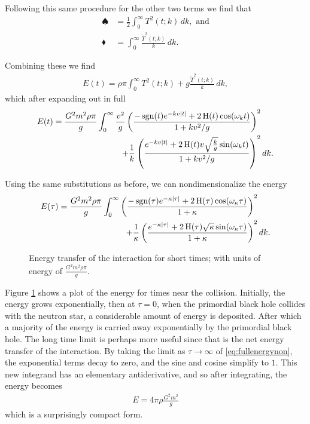 Following this same procedure for the other two terms we find that
\begin{align*}
\spadesuit &= \frac{1}{2} \int_0^\infty T^2(t;k) \, dk, \text{ and} \\
\blacklozenge &= \int_0^\infty \frac{\widetilde{T}^2(t;k)}{k} \, dk.
\end{align*}

Combining these we find
\begin{align*}
E(t) = \rho \pi \int_0^\infty T^2(t;k) + g \frac{\widetilde{T}^2(t;k)}{k} \, dk,
\end{align*}
which after expanding out in full
\begin{equation*}
\begin{split}
E(t) = \frac{G^2 m^2 \rho \pi}{g} \int_0^\infty \frac{v^2}{g} \left( \frac{- \operatorname{sgn}(t) e^{-kv |t|} + 2 \operatorname{H}(t) \cos(\omega_k t)}{1+kv^2/g} \right)^2& \\
+ \frac{1}{k} \left( \frac{e^{-kv |t|} + 2 \operatorname{H}(t) v \sqrt{\frac{k}{g}} \sin(\omega_k t)}{1+kv^2/g} \right)^2& \, dk.
\end{split}
\end{equation*}

Using the same substitutions as before, we can nondimensionalize the energy
\begin{equation}
\label{eq:fullenergynon}
\begin{split}
E(\tau) = \frac{G^2 m^2 \rho \pi}{g} \int_0^\infty \left( \frac{- \operatorname{sgn}(\tau) e^{-\kappa |\tau|} + 2 \operatorname{H}(\tau) \cos(\omega_\kappa \tau)}{1+\kappa} \right)^2& \\
+ \frac{1}{\kappa} \left( \frac{e^{-\kappa |\tau|} + 2 \operatorname{H}(\tau) \sqrt{\kappa} \sin(\omega_\kappa \tau)}{1+\kappa} \right)^2& \, dk.
\end{split}
\end{equation}

\begin{figure}[p]
 
 \caption[Analytic Energy Transfer]{Energy transfer of the interaction for short times; with units of energy of $\frac{G^2 m^2 \rho \pi}{g}$.}
 \label{fig:energy}
\end{figure}

Figure \ref{fig:energy} shows a plot of the energy for times near the collision. Initially, the energy grows exponentially, then at $\tau=0$, when the primordial black hole collides with the neutron star, a considerable amount of energy is deposited. After which a majority of the energy is carried away exponentially by the primordial black hole. The long time limit is perhaps more useful since that is the net energy transfer of the interaction. By taking the limit as $\tau \rightarrow \infty$ of \eqref{eq:fullenergynon}, the exponential terms decay to zero, and the sine and cosine simplify to $1$. This new integrand has an elementary antiderivative, and so after integrating, the energy becomes
\begin{align}
\label{eq:energy}
E = 4 \pi \rho \frac{G^2 m^2}{g}
\end{align}
which is a surprisingly compact form. \\

